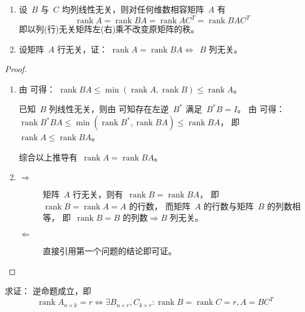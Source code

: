 \documentclass[twoside,openright]{book}
\begin{document}
\begin{CJK*}{UTF8}{}
\begin{quest}
\label{quest:150}
$ $

\begin{enumerate}
\item
设\ $B$ 与\ $C$ 均列线性无关，则对任何维数相容矩阵\ $A$ 有
\[
\operatorname{rank} A = \operatorname{rank} B A = \operatorname{rank} A C^T = \operatorname{rank} B A C^T
\]
即以列(行)无关矩阵左(右)乘不改变原矩阵的秩。
\item
设矩阵\ $A$ 行无关，证：
$ \operatorname{rank} A = \operatorname{rank} B A \Longleftrightarrow $\ $B$ 列无关。
\end{enumerate}
\end{quest}
\begin{proof}
$ $

\begin{enumerate}
\item
由{} 可得：
$\operatorname{rank} B A \leq \min ( \operatorname{rank} A, \operatorname{rank} B) \leq \operatorname{rank} A$。

已知\ $B$ 列线性无关，则由{} 可知存在左逆\ $B^{*}$ 满足\ $B^{*} B = I$。
由{} 可得：
$\operatorname{rank} B^{*} B A \leq \min ( \operatorname{rank} B^{*}, \operatorname{rank} B A) \leq \operatorname{rank} B A$，
即\ $\operatorname{rank} A \leq \operatorname{rank} B A$。

综合以上推导有\ $\operatorname{rank} A = \operatorname{rank} B A$。
\item
\begin{description}
\item[$\Longrightarrow$]
矩阵\ $A$ 行无关，则有\ $\operatorname{rank} B = \operatorname{rank} B A $，
即\ $\operatorname{rank} B = \operatorname{rank} A = A \text{ 的行数}$，
而矩阵\ $A$ 的行数与矩阵\ $B$ 的列数相等，
即\ $\operatorname{rank} B = B \text{ 的列数} \Longrightarrow B \text{ 列无关}$。
\item[$\Longleftarrow$]
直接引用第一个问题的结论即可证。
\end{description}
\end{enumerate}
\end{proof}

\begin{quest}
\label{quest:151}
求证：{} 逆命题成立，即
\[
\operatorname{rank}A_{n\times k}=r
\Longleftrightarrow
\exists B_{n\times r},C_{k\times r}:
\operatorname{rank}B=\operatorname{rank}C=r,
A=BC^T
\]
\end{quest}


\end{CJK*}
\end{document}
